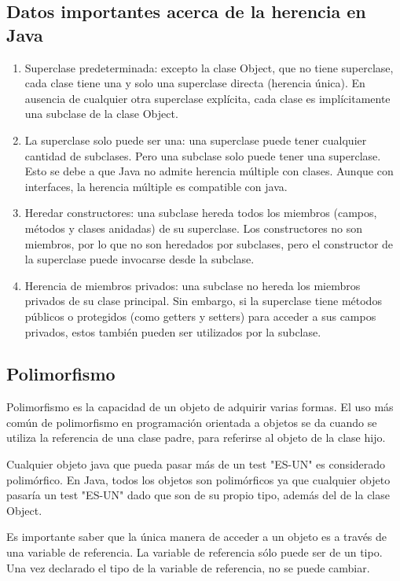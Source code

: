 \documentclass[12pt,a4paper]{report}
\begin{document}
{\subsection*{Datos importantes acerca de la herencia en Java}
\begin{enumerate}
\item Superclase predeterminada: excepto la clase Object, que no tiene superclase, cada clase tiene una y solo una superclase directa (herencia única). En ausencia de cualquier otra superclase explícita, cada clase es implícitamente una subclase de la clase Object.
\item La superclase solo puede ser una: una superclase puede tener cualquier cantidad de subclases. Pero una subclase solo puede tener una superclase. Esto se debe a que Java no admite herencia múltiple con clases. Aunque con interfaces, la herencia múltiple es compatible con java.
\item Heredar constructores: una subclase hereda todos los miembros (campos, métodos y clases anidadas) de su superclase. Los constructores no son miembros, por lo que no son heredados por subclases, pero el constructor de la superclase puede invocarse desde la subclase.
\item Herencia de miembros privados: una subclase no hereda los miembros privados de su clase principal. Sin embargo, si la superclase tiene métodos públicos o protegidos (como getters y setters) para acceder a sus campos privados, estos también pueden ser utilizados por la subclase.
\end{enumerate}
\subsection*{Polimorfismo}
Polimorfismo es la capacidad de un objeto de adquirir varias formas. El uso más común de polimorfismo en programación orientada a objetos se da cuando se utiliza la referencia de una clase padre, para referirse al objeto de la clase hijo.

Cualquier objeto java que pueda pasar más de un test "ES-UN" es considerado polimórfico. En Java, todos los objetos son polimórficos ya que cualquier objeto pasaría un test "ES-UN" dado que son de su propio tipo, además del de la clase Object.

Es importante saber que la única manera de acceder a un objeto es a través de una variable de referencia. La variable de referencia sólo puede ser de un tipo. Una vez declarado el tipo de la variable de referencia, no se puede cambiar.

}
\end{document}
